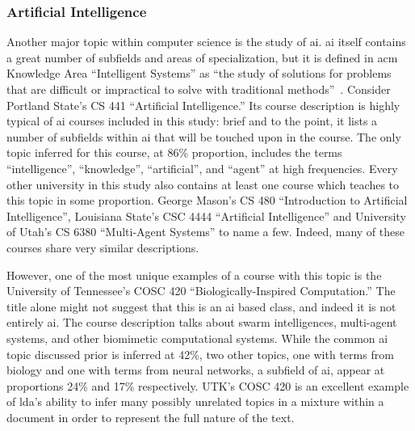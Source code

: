 
\subsubsection{Artificial Intelligence}
\label{sec:eval-topics-ai}


Another major topic within computer science is the study of \ac{ai}.
\ac{ai} itself contains a great number of subfields and areas of specialization, but it is defined in \ac{acm} Knowledge Area ``Intelligent Systems'' as ``the study of solutions for problems that are difficult or impractical to solve with traditional methods''~\cite{CS2013}.
Consider Portland State's CS 441 ``Artificial Intelligence.''
Its course description is highly typical of \ac{ai} courses included in this study: brief and to the point, it lists a number of subfields within \ac{ai} that will be touched upon in the course.
The only topic inferred for this course, at 86\% proportion, includes the terms ``intelligence'', ``knowledge'', ``artificial'', and ``agent'' at high frequencies.
Every other university in this study also contains at least one course which teaches to this topic in some proportion.
George Mason's CS 480 ``Introduction to Artificial Intelligence'', Louisiana State's CSC 4444 ``Artificial Intelligence'' and University of Utah's CS 6380 ``Multi-Agent Systems'' to name a few.
Indeed, many of these courses share very similar descriptions.


However, one of the most unique examples of a course with this topic is the University of Tennessee's COSC 420 ``Biologically-Inspired Computation.''
The title alone might not suggest that this is an \ac{ai} based class, and indeed it is not entirely \ac{ai}.
The course description talks about swarm intelligences, multi-agent systems, and other biomimetic computational systems.
While the common \ac{ai} topic discussed prior is inferred at 42\%, two other topics, one with terms from biology and one with terms from neural networks, a subfield of \ac{ai}, appear at proportions 24\% and 17\% respectively.
UTK's COSC 420 is an excellent example of \ac{lda}'s ability to infer many possibly unrelated topics in a mixture within a document in order to represent the full nature of the text.


